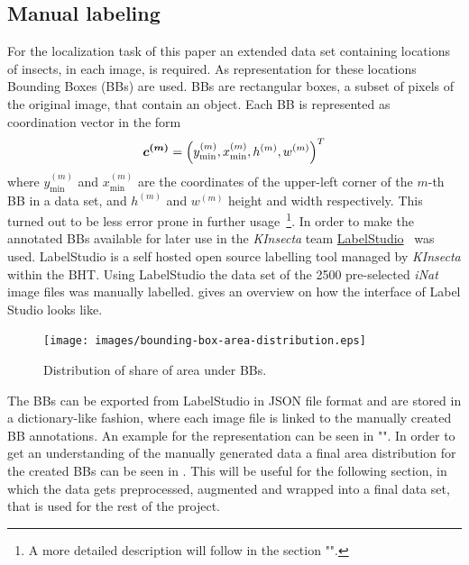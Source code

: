 \subsection{Manual labeling}\label{subsec:manual-labeling}
For the localization task of this paper an extended data set containing locations of insects, in each image, is required.
As representation for these locations Bounding Boxes (BBs) are used.
BBs are rectangular boxes, a subset of pixels of the original image, that contain an object.
Each BB is represented as coordination vector in the form
\begin{align}
    \bm{c^{(m)}} =
    \left(
        y^{(m)}_{\min},
        x^{(m)}_{\min},
        h^{(m)},
        w^{(m)}
    \right)^T
    \label{eq:bb}
\end{align}
where $y^{(m)}_{\min}$ and $x^{(m)}_{\min}$ are the coordinates of the upper-left corner of the $m$-th BB in a data set, and $h^{(m)}$ and $w^{(m)}$ height and width respectively.
This turned out to be less error prone in further usage~\footnote{
    A more detailed description will follow in the section "".
}.
In order to make the annotated BBs available for later use in the \textit{KInsecta} team \href{https://labelstud.io/}{LabelStudio}~\cite{Label-Studio} was used.
LabelStudio is a self hosted open source labelling tool managed by \textit{KInsecta} within the BHT.
Using LabelStudio the data set of the 2500 pre-selected \textit{iNat} image files was manually labelled.
 gives an overview on how the interface of Label Studio looks like.
\begin{figure}
    \centering
    \texttt{[image: images/bounding-box-area-distribution.eps]}
    \caption{Distribution of share of area under BBs.}
    \label{fig:bb-area-distribution}
\end{figure}
The BBs can be exported from LabelStudio in JSON file format and are stored in a dictionary-like fashion, where each image file is linked to the manually created BB annotations.
An example for the representation can be seen in "".
In order to get an understanding of the manually generated data a final area distribution for the created BBs can be seen in .
This will be useful for the following section, in which the data gets preprocessed, augmented and wrapped into a final data set, that is used for the rest of the project.

